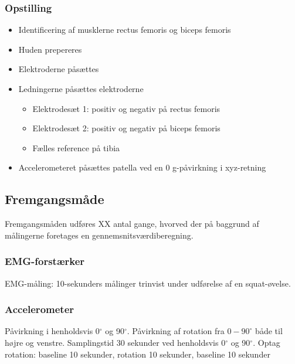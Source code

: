 \subsubsection{Opstilling}
\begin{itemize}
\item Identificering af musklerne rectus femoris og biceps femoris 
\item Huden prepereres
\item Elektroderne påsættes
\item Ledningerne påsættes elektroderne
	\begin{itemize}
	\item Elektrodesæt 1: positiv og negativ på rectus femoris
	\item Elektrodesæt 2: positiv og negativ på biceps femoris
	\item Fælles reference på tibia
	\end{itemize} 
\item Accelerometeret påsættes patella ved en 0 g-påvirkning i xyz-retning
\end{itemize}


\subsection{Fremgangsmåde}
Fremgangsmåden udføres XX antal gange, hvorved der på baggrund af målingerne foretages en gennemsnitsværdiberegning.

\subsubsection{EMG-forstærker}
EMG-måling: 10-sekunders målinger trinvist under udførelse af en squat-øvelse. 


\subsubsection{Accelerometer}
Påvirkning i henholdsvis 0$^{\circ}$ og 90$^{\circ}$.
Påvirkning af rotation fra $0-90^{\circ}$ både til højre og venstre.
Samplingstid 30 sekunder ved henholdsvis 0$^{\circ}$ og 90$^{\circ}$.
Optag rotation: baseline 10 sekunder, rotation 10 sekunder, baseline 10 sekunder %


